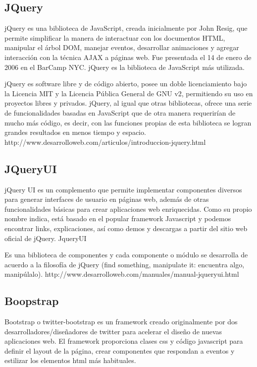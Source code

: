 \subsection{JQuery}
\setlength{\parskip}{5mm}
jQuery es una biblioteca de JavaScript, creada inicialmente por John Resig, que permite simplificar la manera de interactuar con los documentos HTML, manipular el árbol DOM, manejar eventos, desarrollar animaciones y agregar interacción con la técnica AJAX a páginas web. Fue presentada el 14 de enero de 2006 en el BarCamp NYC. jQuery es la biblioteca de JavaScript más utilizada.

jQuery es software libre y de código abierto, posee un doble licenciamiento bajo la Licencia MIT y la Licencia Pública General de GNU v2, permitiendo su uso en proyectos libres y privados. jQuery, al igual que otras bibliotecas, ofrece una serie de funcionalidades basadas en JavaScript que de otra manera requerirían de mucho más código, es decir, con las funciones propias de esta biblioteca se logran grandes resultados en menos tiempo y espacio.
\setlength{\parskip}{0mm}
http://www.desarrolloweb.com/articulos/introduccion-jquery.html

\subsection{JQueryUI}
\setlength{\parskip}{5mm}
jQuery UI es un complemento que permite implementar componentes diversos para generar interfaces de usuario en páginas web, además de otras funcionalidades básicas para crear aplicaciones web enriquecidas. Como su propio nombre indica, está basado en el popular framework Javascript y podemos encontrar links, explicaciones, así como demos y descargas a partir del sitio web oficial de jQuery.
JqueryUI

Es una biblioteca de componentes y cada componente o módulo se desarrolla de acuerdo a la filosofía de jQuery (find something, manipulate it: encuentra algo, manipúlalo).
\setlength{\parskip}{0mm}
http://www.desarrolloweb.com/manuales/manual-jqueryui.html

\subsection{Boopstrap}
\setlength{\parskip}{5mm}
Bootstrap o twitter-bootstrap es un framework creado originalmente por dos desarrolladores/diseñadores de twitter para acelerar el diseño de nuevas aplicaciones web.
El framework proporciona clases css y código javascript para definir el layout de la página, crear componentes que respondan a eventos y estilizar los elementos html más habituales.

